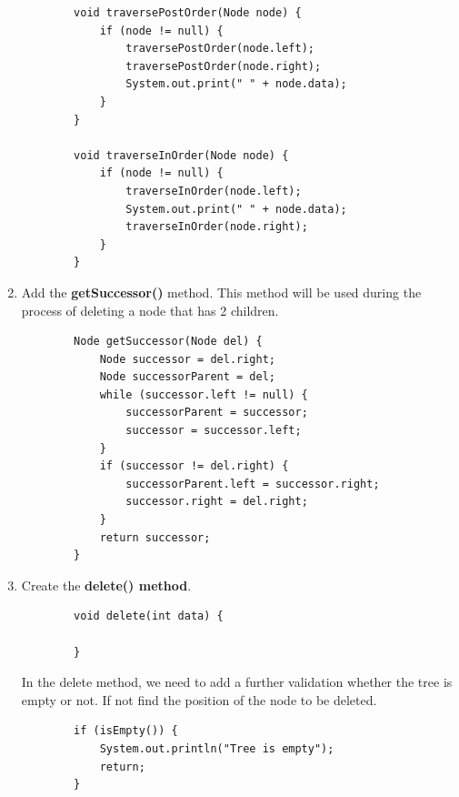\documentclass[12pt,titlepage]{article}
\begin{document}
\begin{enumerate}
\begin{verbatim}
        void traversePostOrder(Node node) {
            if (node != null) {
                traversePostOrder(node.left);
                traversePostOrder(node.right);
                System.out.print(" " + node.data);
            }
        }

        void traverseInOrder(Node node) {
            if (node != null) {
                traverseInOrder(node.left);
                System.out.print(" " + node.data);
                traverseInOrder(node.right);
            }
        }
    \end{verbatim}
    \item Add the \textbf{getSuccessor()} method. This method will be used during the process of deleting a node that has 2 children.
    \begin{verbatim}
        Node getSuccessor(Node del) {
            Node successor = del.right;
            Node successorParent = del;
            while (successor.left != null) {
                successorParent = successor;
                successor = successor.left;
            }
            if (successor != del.right) {
                successorParent.left = successor.right;
                successor.right = del.right;
            }
            return successor;
        }
    \end{verbatim}
    \item Create the \textbf{delete() method}.
    \begin{verbatim}
        void delete(int data) {

        }
    \end{verbatim}
    In the delete method, we need to add a further validation whether the tree is empty or not. If not find the position of the node to be deleted.
    \begin{verbatim}
        if (isEmpty()) {
            System.out.println("Tree is empty");
            return;
        }


\end{verbatim}
\end{enumerate}
\end{document}
